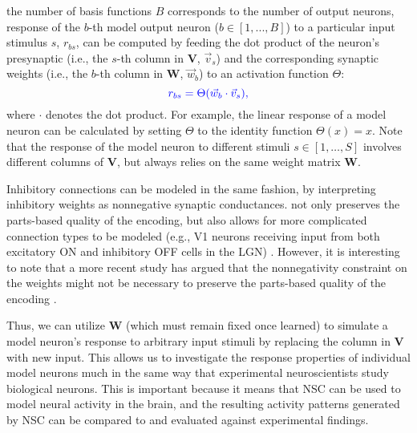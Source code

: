 the number of basis functions $B$ 
corresponds to the number of output neurons, 
response of the $b$-th model output neuron
($b \in [1, ..., B]$)
to a particular input stimulus $s$,  $r_{bs}$,
can be computed by feeding the dot product of the neuron's 
presynaptic 
(i.e., the $s$-th column in \textbf{V}, $\vec{v}_s$)
and the corresponding synaptic weights
(i.e., the $b$-th column in $\mathbf{W}$, $\vec{w}_b$)
to an activation function $\Theta$:
\begin{equation}
\textcolor{blue}{r_{bs} = \Theta(\vec{w}_b \cdot \vec{v}_s),}
\label{eqn:nsc-model-response}
\end{equation}
where $\cdot$ denotes the dot product.
For example, the linear response of a model neuron
can be calculated by setting $\Theta$ to the identity function $\Theta(x)=x$.
Note that the response of the model neuron to different stimuli 
$s \in [1, \ldots, S]$
involves different columns of \textbf{V},
but always relies on the same weight matrix \textbf{W}.

Inhibitory connections can be modeled in the same fashion,
by interpreting inhibitory  weights
as nonnegative synaptic conductances.
 not only preserves the parts-based quality of the encoding,
but also allows for more complicated connection types to be modeled
(e.g., \ac{V1} neurons receiving input from both excitatory ON
and inhibitory OFF cells in the \ac{LGN}) \cite{Hoyer2003}.
However, it is interesting to note that a more recent study has argued
that the nonnegativity constraint on the
 weights might not be necessary 
to preserve the parts-based quality of the encoding \cite{Liu2017}.


Thus, we can utilize \textbf{W} 
(which must remain fixed once learned)
to simulate a model neuron's response to arbitrary input stimuli
by replacing the column in \textbf{V} with new input.
This allows us to investigate the response properties 
of individual model neurons
much in the same way that experimental neuroscientists 
study biological neurons.
This is important because it means that \ac{NSC} can be used to 
model neural activity in the brain, 
and the resulting activity patterns generated by \ac{NSC}
can be compared to and evaluated against experimental findings. 

